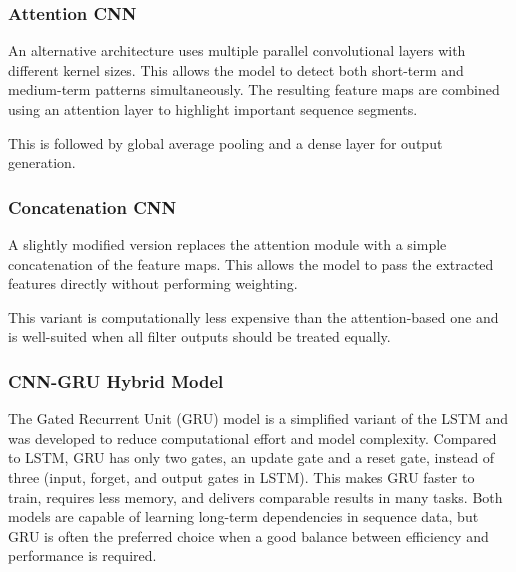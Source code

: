 

\subsubsection{Attention CNN}

An alternative architecture uses multiple parallel convolutional layers with different kernel sizes. This allows the model to detect both short-term and medium-term patterns simultaneously. The resulting feature maps are combined using an attention layer to highlight important sequence segments.

This is followed by global average pooling and a dense layer for output generation.



\subsubsection{Concatenation CNN}

A slightly modified version replaces the attention module with a simple concatenation of the feature maps. This allows the model to pass the extracted features directly without performing weighting.

This variant is computationally less expensive than the attention-based one and is well-suited when all filter outputs should be treated equally.



\subsubsection{CNN-GRU Hybrid Model}

The Gated Recurrent Unit (GRU) model is a simplified variant of the LSTM and was developed to reduce computational effort and model complexity. Compared to LSTM, GRU has only two gates, an update gate and a reset gate, instead of three (input, forget, and output gates in LSTM). This makes GRU faster to train, requires less memory, and delivers comparable results in many tasks. Both models are capable of learning long-term dependencies in sequence data, but GRU is often the preferred choice when a good balance between efficiency and performance is required.


